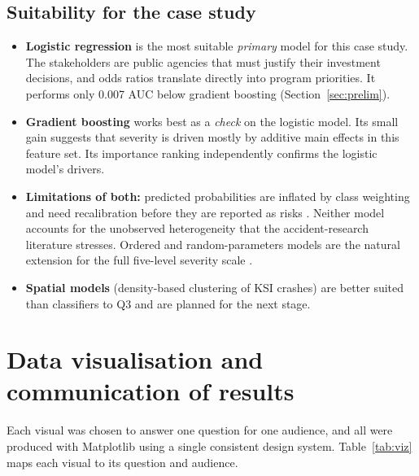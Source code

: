 \documentclass[11pt,a4paper]{article}
\begin{document}
\subsection{Suitability for the case study}
\begin{itemize}
  \item \textbf{Logistic regression} is the most suitable \emph{primary} model for this case study. The
        stakeholders are public agencies that must justify their investment decisions, and odds ratios
        translate directly into program priorities. It performs only 0.007 AUC below gradient boosting
        (Section~\ref{sec:prelim}).
  \item \textbf{Gradient boosting} works best as a \emph{check} on the logistic model. Its small gain suggests
        that severity is driven mostly by additive main effects in this feature set. Its importance ranking
        independently confirms the logistic model's drivers.
  \item \textbf{Limitations of both:} predicted probabilities are inflated by class weighting and need
        recalibration before they are reported as risks \parencite{niculescu2005}. Neither model accounts for
        the unobserved heterogeneity that the accident-research literature stresses. Ordered and random-parameters
        models are the natural extension for the full five-level severity scale
        \parencite{savolainen2011,mannering2014}.
  \item \textbf{Spatial models} (density-based clustering of KSI crashes) are better suited than classifiers to
        Q3 and are planned for the next stage.
\end{itemize}

\section{Data visualisation and communication of results}
\label{sec:viz}

Each visual was chosen to answer one question for one audience, and all were produced with Matplotlib
\parencite{hunter2007} using a single consistent design system. Table~\ref{tab:viz} maps each visual to its
question and audience.
\end{document}
